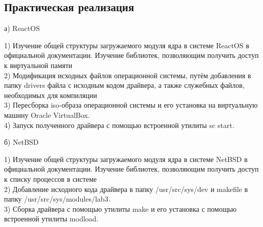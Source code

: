 \documentclass[a4paper, 14pt]{extarticle}
\begin{document}
\vspace{0.1em}


\vspace{2em}
\begin{center}
\section{Практическая реализация}\label{Sect::res}
а) ReactOS
\end{center}
1) Изучение общей структуры загружаемого модуля ядра в системе
ReactOS в официальной документации. Изучение библиотек,
позволяющим получить доступ к виртуальной памяти\\
2) Модификация исходных файлов операционной системы, путём
добавления в папку drivers файла с исходным кодом драйвера, а
также служебных файлов, необходимых для компиляции\\
3) Пересборка iso-образа операционной системы и его установка на
виртуальную машину Oracle VirtualBox.\\
4) Запуск полученного драйвера с помощью встроенной утилиты sc start.\\

\begin{center}
б) NetBSD
\end{center}
1) Изучение общей структуры загружаемого модуля ядра в системе
NetBSD в официальной документации. Изучение библиотек,
позволяющим получить доступ к списку процессов в системе\\
2) Добавление исходного кода драйвера в папку /usr/src/sys/dev и
makefile в папку /usr/src/sys/modules/lab3.\\
3) Сборка драйвера с помощью утилиты make и его установка с
помощью встроенной утилиты modload.\\

\newpage
\end{document}
